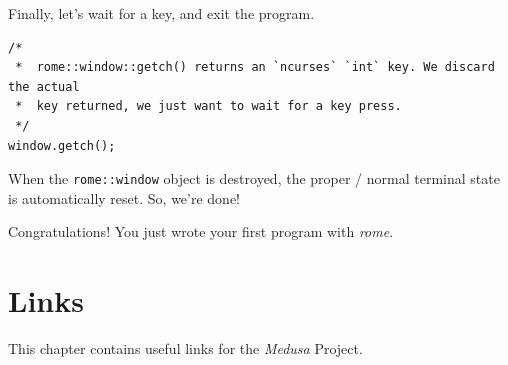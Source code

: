 \documentclass{report}
\newcommand{\Medusa}{\textit{Medusa}\xspace}
\begin{document}
	Finally, let's wait for a key, and exit the program.
	\begin{lstlisting}
/*
 *  rome::window::getch() returns an `ncurses` `int` key. We discard the actual
 *  key returned, we just want to wait for a key press.
 */
window.getch();
	\end{lstlisting}

	When the \texttt{rome::window} object is destroyed, the proper / normal
	terminal state is automatically reset. So, we're done!

	Congratulations! You just wrote your first program with \textit{rome}.

	\chapter{Links}
	This chapter contains useful links for the \Medusa Project.
\end{document}
